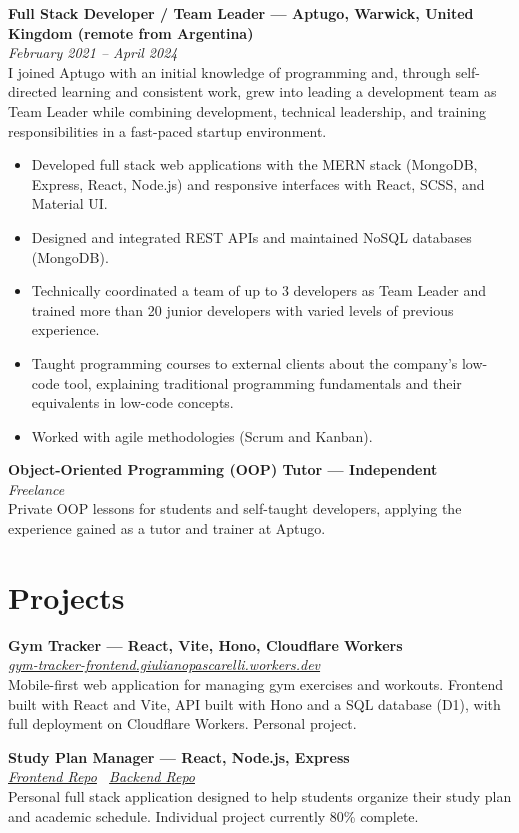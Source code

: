 \documentclass[10pt,a4paper]{article}
\newcommand{\entryheader}[2]{\textbf{#1}\\ \textit{#2}\\[1pt]}
\begin{document}
\vspace{2pt}
\entryheader{Full Stack Developer / Team Leader --- Aptugo, Warwick, United Kingdom (remote from Argentina)}{February 2021 -- April 2024}
I joined Aptugo with an initial knowledge of programming and, through self-directed learning and consistent work, grew into leading a development team as Team Leader while combining development, technical leadership, and training responsibilities in a fast-paced startup environment.
\begin{itemize}[noitemsep, topsep=1pt, partopsep=0pt, leftmargin=16pt]
    \item Developed full stack web applications with the MERN stack (MongoDB, Express, React, Node.js) and responsive interfaces with React, SCSS, and Material UI.
    \item Designed and integrated REST APIs and maintained NoSQL databases (MongoDB).
    \item Technically coordinated a team of up to 3 developers as Team Leader and trained more than 20 junior developers with varied levels of previous experience.
    \item Taught programming courses to external clients about the company's low-code tool, explaining traditional programming fundamentals and their equivalents in low-code concepts.
    \item Worked with agile methodologies (Scrum and Kanban).
\end{itemize}

\vspace{2pt}
\entryheader{Object-Oriented Programming (OOP) Tutor --- Independent}{Freelance}
Private OOP lessons for students and self-taught developers, applying the experience gained as a tutor and trainer at Aptugo.

\section*{Projects}

\entryheader{Gym Tracker --- React, Vite, Hono, Cloudflare Workers}{\href{https://gym-tracker-frontend.giulianopascarelli.workers.dev/}{gym-tracker-frontend.giulianopascarelli.workers.dev}}
Mobile-first web application for managing gym exercises and workouts. Frontend built with React and Vite, API built with Hono and a SQL database (D1), with full deployment on Cloudflare Workers. Personal project.

\vspace{2pt}
\entryheader{Study Plan Manager --- React, Node.js, Express}{\href{https://github.com/lelox028/study-plan-manager-frontend-react}{Frontend Repo} \textbullet\ \href{https://github.com/lelox028/study-plan-manager-api}{Backend Repo}}
Personal full stack application designed to help students organize their study plan and academic schedule. Individual project currently 80\% complete.
\end{document}

